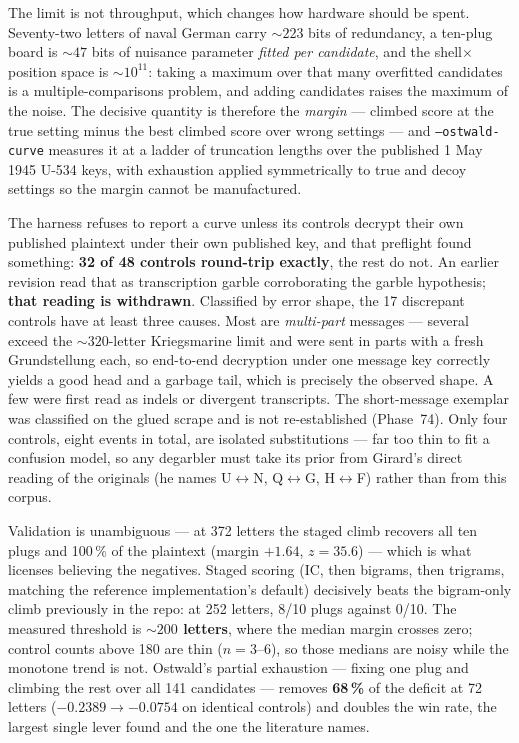 \documentclass[11pt,a4paper]{article}
\begin{document}
The limit is not throughput, which changes how hardware should be spent.
Seventy-two letters of naval German carry ${\sim}223$ bits of redundancy, a
ten-plug board is ${\sim}47$ bits of nuisance parameter \emph{fitted per
candidate}, and the shell${\times}$position space is ${\sim}10^{11}$: taking a
maximum over that many overfitted candidates is a multiple-comparisons problem,
and adding candidates raises the maximum of the noise.
The decisive quantity is therefore the \emph{margin} --- climbed score at the true
setting minus the best climbed score over wrong settings --- and
\texttt{--ostwald-curve} measures it at a ladder of truncation lengths over the
published 1 May 1945 U-534 keys, with exhaustion applied symmetrically to true and
decoy settings so the margin cannot be manufactured.

The harness refuses to report a curve unless its controls decrypt their own
published plaintext under their own published key, and that preflight found
something: \textbf{32 of 48 controls round-trip exactly}, the rest do not.
An earlier revision read that as transcription garble corroborating the garble
hypothesis; \textbf{that reading is withdrawn}.
Classified by error shape, the 17 discrepant controls have at least three causes.
Most are \emph{multi-part} messages --- several exceed the ${\sim}320$-letter
Kriegsmarine limit and were sent in parts with a fresh Grundstellung each, so
end-to-end decryption under one message key correctly yields a good head and a
garbage tail, which is precisely the observed shape.
A few were first read as indels or divergent transcripts. The short-message
exemplar was classified on the glued scrape and is not re-established (Phase~74).
Only four controls, eight events in total, are isolated substitutions --- far too
thin to fit a confusion model, so any degarbler must take its prior from Girard's
direct reading of the originals (he names U$\leftrightarrow$N, Q$\leftrightarrow$G,
H$\leftrightarrow$F) rather than from this corpus.

Validation is unambiguous --- at 372 letters the staged climb recovers all ten
plugs and 100\,\% of the plaintext (margin $+1.64$, $z=35.6$) --- which is what
licenses believing the negatives.
Staged scoring (IC, then bigrams, then trigrams, matching the reference
implementation's default) decisively beats the bigram-only climb previously in the
repo: at 252 letters, 8/10 plugs against 0/10.
The measured threshold is \textbf{${\sim}200$ letters}, where the median margin
crosses zero; control counts above 180 are thin ($n=3$--6), so those medians are
noisy while the monotone trend is not.
Ostwald's partial exhaustion --- fixing one plug and climbing the rest over all 141
candidates --- removes \textbf{68\,\%} of the deficit at 72 letters
($-0.2389 \to -0.0754$ on identical controls) and doubles the win rate, the largest
single lever found and the one the literature names.
\end{document}
